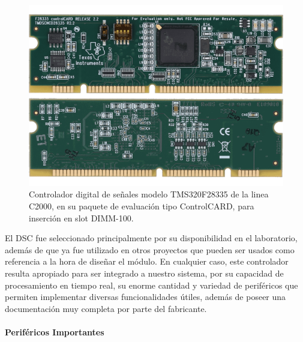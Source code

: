 \begin{figure}[h]
    \centering
    \includegraphics[scale=0.22]{Imagenes/ControlCARD.png}
    \caption{Controlador digital de señales modelo TMS320F28335 de la linea C2000, en su paquete de evaluación tipo ControlCARD, para inserción en slot DIMM-100.}
    \label{ControlCARD}
\end{figure}

El DSC fue seleccionado principalmente por su disponibilidad en el laboratorio, además de que ya fue utilizado en otros proyectos que pueden ser usados como referencia a la hora de diseñar el módulo. En cualquier caso, este controlador resulta apropiado para ser integrado a nuestro sistema, por su capacidad de procesamiento en tiempo real, su enorme cantidad y variedad de periféricos que permiten implementar diversas funcionalidades útiles, además de poseer una documentación muy completa por parte del fabricante.\\

\paragraph{Periféricos Importantes}
